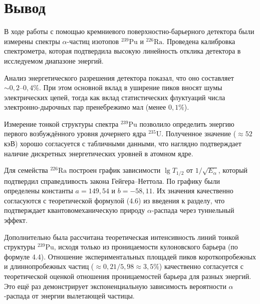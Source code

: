\documentclass[12pt, a4paper]{article}
\begin{document}
\section*{Вывод}

В ходе работы с помощью кремниевого поверхностно-барьерного детектора были измерены спектры $\alpha$-частиц изотопов $^{239}\text{Pu}$ и $^{226}\text{Ra}$. Проведена калибровка спектрометра, которая подтвердила высокую линейность отклика детектора в исследуемом диапазоне энергий.

Анализ энергетического разрешения детектора показал, что оно составляет $\sim 0,2\text{--}0,4\%$. При этом основной вклад в уширение пиков вносят шумы электрических цепей, тогда как вклад статистических флуктуаций числа электронно-дырочных пар пренебрежимо мал (менее $0,1\%$). 

Измерение тонкой структуры спектра $^{239}\text{Pu}$ позволило определить энергию первого возбуждённого уровня дочернего ядра $^{235}\text{U}$. Полученное значение ($\approx 52$ кэВ) хорошо согласуется с табличными данными, что наглядно подтверждает наличие дискретных энергетических уровней в атомном ядре.

Для семейства $^{226}\text{Ra}$ построен график зависимости $\lg T_{1/2}$ от $1/\sqrt{E_\alpha}$, который подтвердил справедливость закона Гейгера--Неттола. По графику были определены константы $a = 149,54$ и $b = -58,11$. Их значения качественно согласуются с теоретической формулой (4.6) из введения к разделу, что подтверждает квантовомеханическую природу $\alpha$-распада через туннельный эффект.

Дополнительно была рассчитана теоретическая интенсивность линий тонкой структуры $^{239}\text{Pu}$, исходя только из проницаемости кулоновского барьера (по формуле 4.4). Отношение экспериментальных площадей пиков короткопробежных и длиннопробежных частиц ($\approx 0,21 / 5,98 \approx 3,5\%$) качественно согласуется с теоретической оценкой отношения проницаемостей барьера для разных энергий. Это ещё раз демонстрирует экспоненциальную зависимость вероятности $\alpha$-распада от энергии вылетающей частицы.

\end{document}
